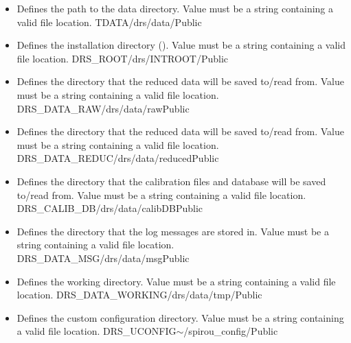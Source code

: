 \begin{itemize}

\item {} 
{Defines the path to the data directory. Value must be a string containing a valid file location.}
{TDATA}{/drs/data/}{\AllRecipes}{\configtxtfile}{\spirouConst}{Public}

\item {} 
{Defines the installation directory (\InstallDIR). Value must be a string containing a valid file location.}
{DRS\_ROOT}{/drs/INTROOT/}{\AllRecipes}{\configtxtfile}{\spirouConst}{Public}

\item {} 
{Defines the directory that the reduced data will be saved to/read from. Value must be a string containing a valid file location.}
{DRS\_DATA\_RAW}{/drs/data/raw}{\AllRecipes}{\configtxtfile}{\spirouConst}{Public}

\item {} 
{Defines the directory that the reduced data will be saved to/read from. Value must be a string containing a valid file location.}
{DRS\_DATA\_REDUC}{/drs/data/reduced}{\AllRecipes}{\configtxtfile}{\spirouConst}{Public}

\item {} 
{Defines the directory that the calibration files and database will be saved to/read from. Value must be a string containing a valid file location.}
{DRS\_CALIB\_DB}{/drs/data/calibDB}{\AllRecipes}{\configtxtfile}{\spirouConst}{Public}

\item {} 
{Defines the directory that the log messages are stored in. Value must be a string containing a valid file location.}
{DRS\_DATA\_MSG}{/drs/data/msg}{\AllRecipes}{\configtxtfile}{\spirouConst}{Public}

\item {} 
{Defines the working directory. Value must be a string containing a valid file location.}
{DRS\_DATA\_WORKING}{/drs/data/tmp/}{\AllRecipes}{\configtxtfile}{\spirouConst}{Public}

\item {} 
{Defines the custom configuration directory. Value must be a string containing a valid file location.}
{DRS\_UCONFIG}{$\sim$/spirou\_config/}{\AllRecipes}{\configtxtfile}{\spirouConst}{Public}


\end{itemize}





